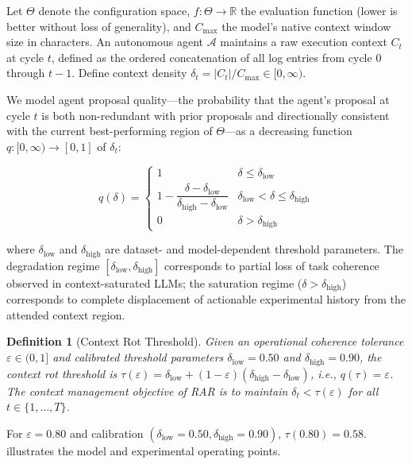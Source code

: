 \documentclass[conference]{IEEEtran}
\newtheorem{definition}{Definition}
\newcommand{\dlt}{\delta_t}
\newcommand{\dlow}{\delta_{\mathrm{low}}}
\newcommand{\dhigh}{\delta_{\mathrm{high}}}
\newcommand{\Cmax}{C_{\max}}
\newcommand{\Ct}{C_t}
\begin{document}
Let $\Theta$ denote the configuration space, $f : \Theta \rightarrow \mathbb{R}$ the evaluation function (lower is better without loss of generality), and $\Cmax$ the model's native context window size in characters. An autonomous agent $\mathcal{A}$ maintains a raw execution context $\Ct$ at cycle $t$, defined as the ordered concatenation of all log entries from cycle 0 through $t{-}1$. Define context density $\dlt = |\Ct| / \Cmax \in [0, \infty)$.

We model agent proposal quality---the probability that the agent's proposal at cycle $t$ is both non-redundant with prior proposals and directionally consistent with the current best-performing region of $\Theta$---as a decreasing function $q : [0,\infty) \rightarrow [0,1]$ of $\dlt$:

\begin{equation}
  q(\delta) =
  \begin{cases}
    1 & \delta \leq \dlow \\
    1 - \dfrac{\delta - \dlow}{\dhigh - \dlow} & \dlow < \delta \leq \dhigh \\
    0 & \delta > \dhigh
  \end{cases}
  \label{eq:degradation}
\end{equation}

where $\dlow$ and $\dhigh$ are dataset- and model-dependent threshold parameters. The degradation regime $[\dlow, \dhigh]$ corresponds to partial loss of task coherence observed in context-saturated LLMs; the saturation regime ($\delta > \dhigh$) corresponds to complete displacement of actionable experimental history from the attended context region.

\begin{definition}[Context Rot Threshold]
  \label{def:threshold}
  Given an operational coherence tolerance $\varepsilon \in (0,1]$ and calibrated threshold parameters $\dlow{=}0.50$ and $\dhigh{=}0.90$, the context rot threshold is $\tau(\varepsilon) = \dlow + (1-\varepsilon)(\dhigh - \dlow)$, i.e., $q(\tau) = \varepsilon$. The context management objective of RAR is to maintain $\dlt < \tau(\varepsilon)$ for all $t \in \{1,\ldots,T\}$.
\end{definition}

For $\varepsilon = 0.80$ and calibration $(\dlow{=}0.50, \dhigh{=}0.90)$, $\tau(0.80) = 0.58$.  illustrates the model and experimental operating points.
\end{document}
